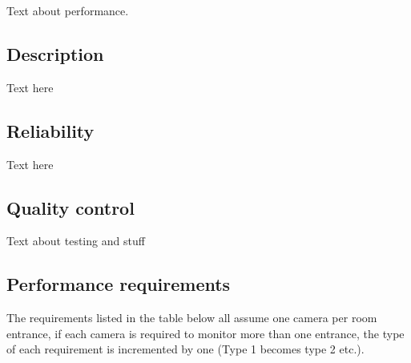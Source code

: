 Text about performance.


\subsection{Description}
Text here

\subsection{Reliability}
Text here

\subsection{Quality control}
Text about testing and stuff

\subsection{Performance requirements}
The requirements listed in the table below all assume one camera per room entrance, if each camera is required to monitor more than one entrance, the type of each requirement is incremented by one (Type 1 becomes type 2 etc.).
\label{sec:performance_req}
\reqtable
{
}